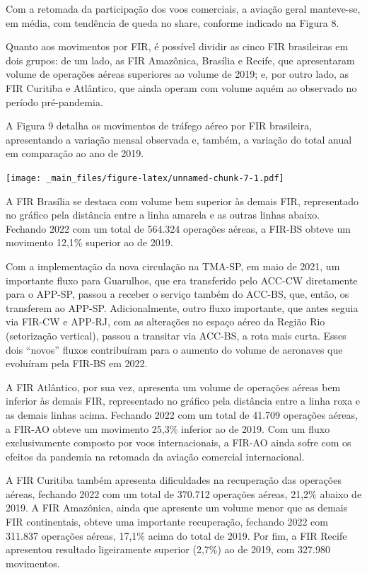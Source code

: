 \documentclass[
]{book}
\begin{document}
Com a retomada da participação dos voos comerciais, a aviação geral manteve-se, em média, com tendência de queda no share, conforme indicado na Figura 8.

Quanto aos movimentos por FIR, é possível dividir as cinco FIR brasileiras em dois grupos: de um lado, as FIR Amazônica, Brasília e Recife, que apresentaram volume de operações aéreas superiores ao volume de 2019; e, por outro lado, as FIR Curitiba e Atlântico, que ainda operam com volume aquém ao observado no período pré-pandemia.

A Figura 9 detalha os movimentos de tráfego aéreo por FIR brasileira, apresentando a variação mensal observada e, também, a variação do total anual em comparação ao ano de 2019.

\texttt{[image: \_main\_files/figure-latex/unnamed-chunk-7-1.pdf]}

A FIR Brasília se destaca com volume bem superior às demais FIR, representado no gráfico pela distância entre a linha amarela e as outras linhas abaixo. Fechando 2022 com um total de 564.324 operações aéreas, a FIR-BS obteve um movimento 12,1\% superior ao de 2019.

Com a implementação da nova circulação na TMA-SP, em maio de 2021, um importante fluxo para Guarulhos, que era transferido pelo ACC-CW diretamente para o APP-SP, passou a receber o serviço também do ACC-BS, que, então, os transferem ao APP-SP. Adicionalmente, outro fluxo importante, que antes seguia via FIR-CW e APP-RJ, com as alterações no espaço aéreo da Região Rio (setorização vertical), passou a transitar via ACC-BS, a rota mais curta. Esses dois ``novos'' fluxos contribuíram para o aumento do volume de aeronaves que evoluíram pela FIR-BS em 2022.

A FIR Atlântico, por sua vez, apresenta um volume de operações aéreas bem inferior às demais FIR, representado no gráfico pela distância entre a linha roxa e as demais linhas acima. Fechando 2022 com um total de 41.709 operações aéreas, a FIR-AO obteve um movimento 25,3\% inferior ao de 2019. Com um fluxo exclusivamente composto por voos internacionais, a FIR-AO ainda sofre com os efeitos da pandemia na retomada da aviação comercial internacional.

A FIR Curitiba também apresenta dificuldades na recuperação das operações aéreas, fechando 2022 com um total de 370.712 operações aéreas, 21,2\% abaixo de 2019. A FIR Amazônica, ainda que apresente um volume menor que as demais FIR continentais, obteve uma importante recuperação, fechando 2022 com 311.837 operações aéreas, 17,1\% acima do total de 2019. Por fim, a FIR Recife apresentou resultado ligeiramente superior (2,7\%) ao de 2019, com 327.980 movimentos.
\end{document}
